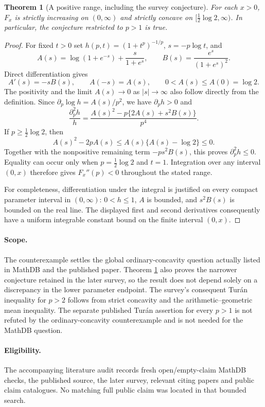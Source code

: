 \documentclass[11pt]{article}
\newtheorem{theorem}{Theorem}
\begin{document}
\begin{theorem}[A positive range, including the survey conjecture]
\label{thm:positive}
For each $x>0$, $F_x$ is strictly increasing on $(0,\infty)$ and
strictly concave on $[\tfrac12\log2,\infty)$.
In particular, the conjecture restricted to $p>1$ is true.
\end{theorem}
\begin{proof}
For fixed $t>0$ set $h(p,t)=(1+t^p)^{-1/p}$,
$s=-p\log t$, and
\[
 A(s)=\log(1+e^{-s})+\frac{s}{1+e^s},
 \qquad B(s)=\frac{e^s}{(1+e^s)^2}.
\]
Direct differentiation gives
\[
 A'(s)=-sB(s),\qquad A(-s)=A(s),\qquad
 0<A(s)\le A(0)=\log2.
\]
The positivity and the limit $A(s)\to0$ as $|s|\to\infty$
also follow directly from the definition.
Since $\partial_p\log h=A(s)/p^2$, we have $\partial_p h>0$ and
\begin{equation}\label{eq:second}
 \frac{\partial_p^2h}{h}
 =\frac{A(s)^2-p\{2A(s)+s^2B(s)\}}{p^4}.
\end{equation}
If $p\ge\tfrac12\log2$, then
\[
 A(s)^2-2pA(s)\le A(s)\{A(s)-\log2\}\le0.
\]
Together with the nonpositive remaining term $-ps^2B(s)$,
this proves $\partial_p^2h\le0$. Equality can occur only when
$p=\tfrac12\log2$ and $t=1$. Integration over any interval
$(0,x)$ therefore gives $F_x''(p)<0$ throughout the stated range.

For completeness, differentiation under the integral is justified on
every compact parameter interval in $(0,\infty)$: $0<h\le1$,
$A$ is bounded, and $s^2B(s)$ is bounded on the real line.
The displayed first and second derivatives consequently have a
uniform integrable constant bound on the finite interval $(0,x)$.
\end{proof}

\paragraph{Scope.}
The counterexample settles the global ordinary-concavity question
actually listed in MathDB and the published paper. Theorem
\ref{thm:positive} also proves the narrower conjecture retained in
the later survey, so the result does not depend solely on a discrepancy
in the lower parameter endpoint. The survey's consequent
Tur\'an inequality for $p>2$ follows from strict concavity and the
arithmetic--geometric mean inequality.
The separate published Tur\'an assertion for every $p>1$ is not
refuted by the ordinary-concavity counterexample and is not needed
for the MathDB question.

\paragraph{Eligibility.}
The accompanying literature audit records fresh open/empty-claim
MathDB checks, the published source, the later survey, relevant
citing papers and public claim catalogues. No matching full public
claim was located in that bounded search.
\end{document}

